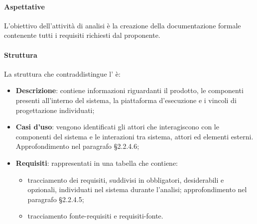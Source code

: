 \paragraph{Aspettative}
L'obiettivo dell'attività di analisi è la creazione della documentazione formale contenente tutti i requisiti richiesti dal proponente.
\paragraph{Struttura}
La struttura che contraddistingue l'\AdR{} è:
\begin{itemize}
	\item \textbf{Descrizione}: contiene informazioni riguardanti il prodotto, le componenti presenti all'interno del sistema, la piattaforma d'esecuzione e i vincoli di progettazione individuati;
	\item \textbf{Casi d'uso}: vengono identificati gli attori che interagiscono con le componenti del sistema e le interazioni tra sistema, attori ed elementi esterni. Approfondimento nel paragrafo §2.2.4.6;
	\item \textbf{Requisiti}: rappresentati in una tabella che contiene:
	\begin{itemize}
 		\item tracciamento dei requisiti, suddivisi in obbligatori, desiderabili e opzionali, individuati nel sistema durante l'analisi; approfondimento nel paragrafo §2.2.4.5;
		\item tracciamento fonte-requisiti e requisiti-fonte. 
	\end{itemize}
\end{itemize}
